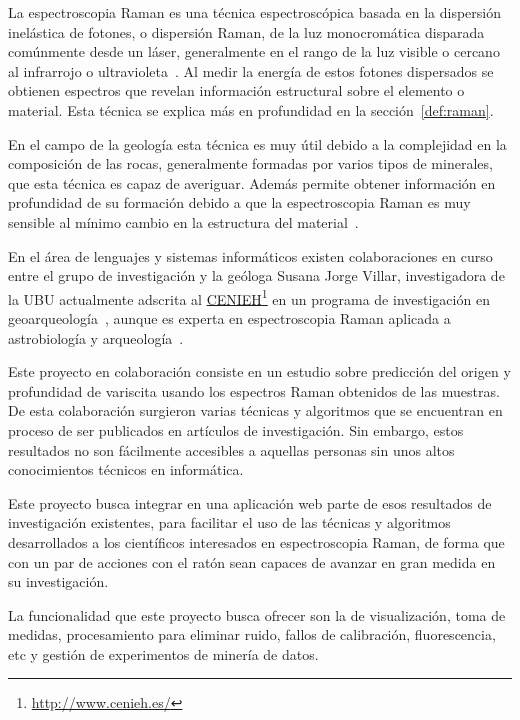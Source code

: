 \label{ch:introduccion}

La espectroscopia Raman es una técnica espectroscópica basada en la dispersión
inelástica de fotones, o dispersión Raman, de la luz monocromática disparada
comúnmente desde un láser\cite{raman-basics}, generalmente en el rango de la luz
visible o cercano al infrarrojo o ultravioleta~\cite{wiki:raman-en}. Al medir la
energía de estos fotones dispersados se obtienen espectros que revelan
información estructural sobre el elemento o material. Esta técnica se explica
más en profundidad en la sección~\ref{def:raman}.

En el campo de la geología esta técnica es muy útil debido a la complejidad en
la composición de las rocas, generalmente formadas por varios tipos de
minerales, que esta técnica es capaz de averiguar. Además permite obtener
información en profundidad de su formación debido a que la espectroscopia Raman
es muy sensible al mínimo cambio en la estructura del
material~\cite{quora:raman-geology}.

En el área de lenguajes y sistemas informáticos existen colaboraciones en curso
entre el grupo de investigación
 y la geóloga Susana Jorge
Villar, investigadora de la UBU actualmente adscrita al
\href{http://www.cenieh.es/}{CENIEH}\footnote{\url{http://www.cenieh.es/}} en un
programa de investigación en geoarqueología~\cite{susana-cenieh}, aunque es
experta en espectroscopia Raman aplicada a astrobiología y
arqueología~\cite{susana-ubu}.

Este proyecto en colaboración consiste en un estudio sobre predicción del origen
y profundidad de variscita usando los espectros Raman obtenidos de las muestras.
De esta colaboración surgieron varias técnicas y algoritmos que se encuentran en
proceso de ser publicados en artículos de investigación. Sin embargo, estos
resultados no son fácilmente accesibles a aquellas personas sin unos altos
conocimientos técnicos en informática.

Este proyecto busca integrar en una aplicación web parte de esos resultados de
investigación existentes, para facilitar el uso de las técnicas y algoritmos
desarrollados a los científicos interesados en espectroscopia Raman, de forma
que con un par de acciones con el ratón sean capaces de avanzar en gran medida
en su investigación.

La funcionalidad que este proyecto busca ofrecer son la de visualización, toma
de medidas, procesamiento para eliminar ruido, fallos de calibración,
fluorescencia, etc y gestión de experimentos de minería de datos.

